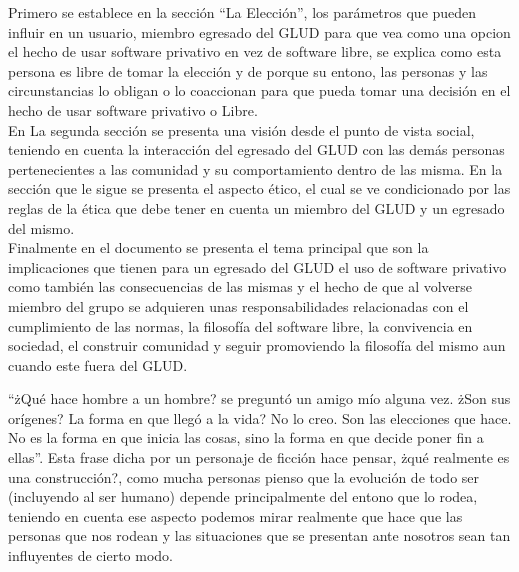 \begin{multicols}{2}



\vspace{2mm}
Primero se establece en la sección ``La Elección'', los parámetros que pueden influir en un usuario, miembro egresado
del GLUD para que vea como una opcion el hecho de usar software privativo en vez de software libre, se explica como esta
persona es libre de tomar la elección y de porque su entono, las personas y las circunstancias lo obligan o lo coaccionan
para que pueda tomar una decisión en el hecho de usar software privativo o Libre.\\

En La segunda sección se presenta una visión desde el punto de vista social, teniendo en cuenta la interacción del egresado 
del GLUD con las demás personas pertenecientes a las comunidad y su comportamiento dentro de las misma. En la sección que 
le sigue se presenta el aspecto ético, el cual se ve condicionado por las reglas de la ética que debe tener en cuenta un 
miembro del GLUD y un egresado del mismo.\\

Finalmente en el documento se presenta el tema principal que son la implicaciones que tienen para un egresado del GLUD el 
uso de software privativo como también las consecuencias de las mismas y el hecho de que al volverse miembro del grupo 
se adquieren unas responsabilidades relacionadas con el cumplimiento de las normas, la filosofía del software libre, 
la convivencia en sociedad, el construir comunidad y seguir promoviendo la filosofía del mismo aun cuando este fuera del GLUD. 




``żQué hace hombre a un hombre? se preguntó un amigo mío alguna vez. żSon sus orígenes? La forma en que llegó a la vida? 
No lo creo. Son las elecciones que hace. No es la forma en que inicia las cosas, sino la forma en que decide poner fin 
a ellas''.\cite{hellboy} Esta frase dicha por un personaje de ficción hace pensar, żqué realmente es una construcción?, 
como mucha personas pienso que la evolución de todo ser (incluyendo al ser humano) depende principalmente del entono que 
lo rodea, teniendo en cuenta ese aspecto podemos mirar realmente que hace que las personas que nos rodean y las 
situaciones que se presentan ante nosotros sean tan influyentes de cierto modo.\\


\end{multicols}

